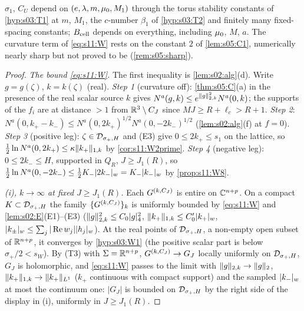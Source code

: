 $\sigma_1$, $C_U$ depend on $(e,\lambda,m,\mu_0,M_1)$ through the torus stability constants of \cref{hyp:s03:T1} at $m$, $M_1$, the $c$-number $\beta_1$ of \cref{hyp:s03:T2} and finitely many fixed-spacing constants; $B_{\rm cell}$ depends on everything, including $\mu_0$, $M$, $a$. The curvature term of \eqref{eq:s11:W} rests on the constant $2$ of \cref{lem:s05:C1}, numerically nearly sharp but not proved to be (\cref{rem:s05:sharp}).

\begin{proof}
\emph{The bound \eqref{eq:s11:W}.} The first inequality is \cref{lem:s02:alg}(d). Write $g=g(\zeta)$, $k=k(\zeta)$ (real). \emph{Step 1} (curvature off): \cref{thm:s05:C}(a) in the presence of the real scalar source $k$ gives $N^a(g,k)\le e^{\lVert g\rVert_{2,k}^2}N^a(0,k)$; the supports of the $f_i$ are at distance $>1$ from $\mathbb R^3\setminus C_J$ since $MJ\ge R+\ell_c>R+1$. \emph{Step 2}: $N^a(0,k_+-k_-)\le N^a(0,2k_+)^{1/2}N^a(0,-2k_-)^{1/2}$ (\cref{lem:s02:alg}(f) at $f=0$). \emph{Step 3} (positive leg): $\zeta\in\mathcal D_{\sigma_+,H}$ and (E3) give $0\le2k_+\le s_1$ on the lattice, so $\frac12\ln N^a(0,2k_+)\le\kappa\lVert k_+\rVert_{1,k}$ by \cref{cor:s11:W2prime}. \emph{Step 4} (negative leg): $0\le2k_-\le H$, supported in $Q_R$, $J\ge J_1(R)$, so $\frac12\ln N^a(0,-2k_-)\le\frac12K_-\lvert 2k_-\rvert_{w}=K_-\lvert k_-\rvert_{w}$ by \cref{prop:s11:W8}.

\emph{(i), $k\to\infty$ at fixed $J\ge J_1(R)$.} Each $G^{(k,C_J)}$ is entire on $\mathbb C^{n+p}$. On a compact $K\subset\mathcal D_{\sigma_+,H}$ the family $\{G^{(k,C_J)}\}_k$ is uniformly bounded by \eqref{eq:s11:W} and \cref{lem:s02:E}(E1)--(E3) ($\lVert g\rVert_{2,k}^2\le C_0\lvert g\rvert_{4}^2$, $\lVert k_+\rVert_{1,k}\le C_0'\lvert k_+\rvert_{w}$, $\lvert k_\pm\rvert_{w}\le\sum_j|\operatorname{Re} w_j|\lvert h_j\rvert_{w}$). At the real points of $\mathcal D_{\sigma_+,H}$, a non-empty open subset of $\mathbb R^{n+p}$, it converges by \cref{hyp:s03:W1} (the positive scalar part is below $\sigma_+/2<s_W$). By (T3) with $\Sigma=\mathbb R^{n+p}$, $G^{(k,C_J)}\to G_J$ locally uniformly on $\mathcal D_{\sigma_+,H}$, $G_J$ is holomorphic, and \eqref{eq:s11:W} passes to the limit with $\lVert g\rVert_{2,k}\to\lVert g\rVert_2$, $\lVert k_+\rVert_{1,k}\to\lVert k_+\rVert_{L^1}$ ($k_+$ continuous with compact support) and the sampled $\lvert k_-\rvert_{w}$ at most the continuum one: $|G_J|$ is bounded on $\mathcal D_{\sigma_+,H}$ by the right side of the display in (i), uniformly in $J\ge J_1(R)$.


\end{proof}
